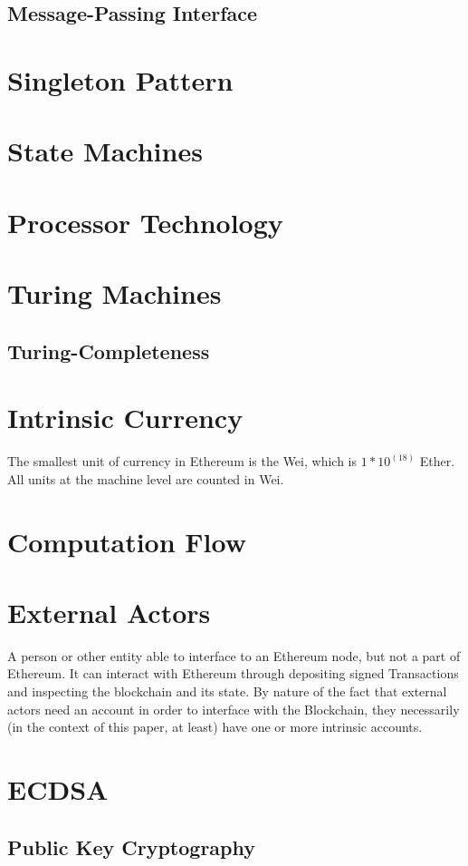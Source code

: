 \documentclass[10pt,a4paper,leqno,bibliography=totoc]{scrartcl}
\newenvironment{alphafootnotes}
{\par\edef\savedfootnotenumber{\number\value{footnote}}
\renewcommand{\thefootnote}{\alph{footnote}}
\setcounter{footnote}{0}}
{\par\setcounter{footnote}{\savedfootnotenumber}}
\begin{document}
\begin{alphafootnotes}
\begin{multicols*}{2}
		\subsection{Message-Passing Interface}
	\section{Singleton Pattern}
	\section{State Machines}
	\section{Processor Technology}
	\section{Turing Machines}
		\subsection{Turing-Completeness}
	\section{Intrinsic Currency}
		The smallest unit of currency in Ethereum is the Wei, which is $1*10^(18)$ Ether. All units at the machine level are counted in Wei.
	\section{Computation Flow}
	
	\section{External Actors} A person or other entity able to interface to an Ethereum node, but not a part of Ethereum. It can interact with Ethereum through depositing signed Transactions and inspecting the blockchain and its state. By nature of the fact that external actors need an account in order to interface with the Blockchain, they necessarily (in the context of this paper, at least) have one or more intrinsic accounts.

	\section{ECDSA}

		\subsection{Public Key Cryptography}

\end{multicols*}
\end{alphafootnotes}
\end{document}
